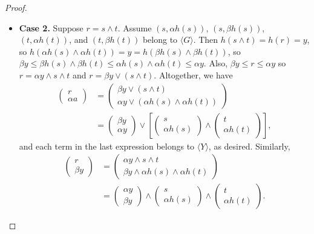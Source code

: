 \begin{proof}
\begin{itemize}
\item {\bf Case 2.} Suppose $r = s \wedge t$. Assume $(s, \alpha {h(s)})$, 
$(s, \beta{h(s)})$, $(t, \alpha {h(t)})$, and $(t, \beta{h(t)})$ belong 
to $\langle G \rangle$. Then $h(s\wedge t) = h(r) = y$, so 
$h(\alpha {h(s)} \wedge\alpha {h(t)}) = y = h(\beta {h(s)} \wedge\beta {h(t)})$, 
so $\beta y \leqslant \beta h(s) \wedge \beta h(t) \leqslant \alpha {h(s)} \wedge \alpha {h(t)} \leqslant \alpha y$.
Also, $\beta y \leqslant r \leqslant \alpha y$ so $r = \alpha y \wedge s\wedge t$
and $r = \beta y \vee (s\wedge t)$. Altogether, we have
\begin{align*}
\left(\begin{array}{c} r \\ \alpha a\end{array}\right) &= 
\left(\begin{array}{c} \beta y \vee (s\wedge t) \\ \alpha y \vee (\alpha {h(s)} \wedge \alpha {h(t)}) \end{array}\right)\\
&= \left(\begin{array}{c} \beta y\\ \alpha y\end{array}\right) \vee
\left[\left(\begin{array}{c}s \\ \alpha {h(s)}\end{array}\right) \wedge \left(\begin{array}{c}t \\ \alpha {h(t)} \end{array}\right)\right],
\end{align*}
and each term in the last expression belongs to $\langle Y \rangle$, as desired.
Similarly,
\begin{align*}
\left(\begin{array}{c} r \\ \beta y\end{array}\right) &= 
\left(\begin{array}{c} \alpha y \wedge s\wedge t \\ \beta y \wedge \alpha {h(s)} \wedge \alpha {h(t)} \end{array}\right)\\
&= \left(\begin{array}{c} \alpha y\\ \beta y\end{array}\right) \wedge 
\left(\begin{array}{c}s \\ \alpha {h(s)}\end{array}\right) \wedge \left(\begin{array}{c}t \\ \alpha {h(t)} \end{array}\right).

\end{align*}
\end{itemize}
\end{proof}
